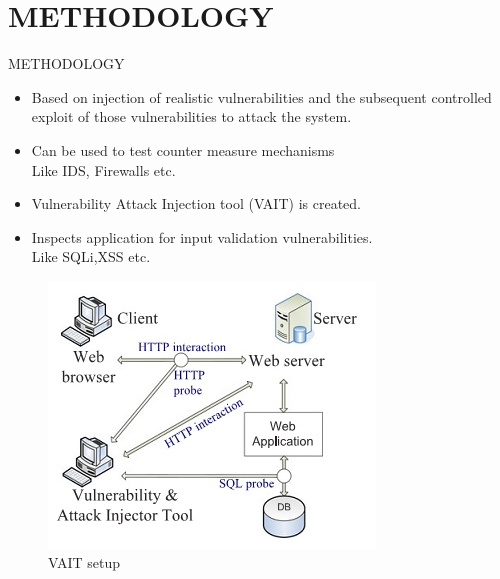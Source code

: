 \documentclass[xcolor=x11names,compress]{beamer}
\renewcommand{\(}{\begin{columns}}
\renewcommand{\)}{\end{columns}}
\newcommand{\<}[1]{\begin{column}{#1}}
\renewcommand{\>}{\end{column}}
\begin{document}
\section{\scshape METHODOLOGY}
\begin{frame}
\end{frame}
\begin{frame}{METHODOLOGY}
\begin{itemize}
	\item Based on injection of realistic vulnerabilities and the
	subsequent controlled exploit of those vulnerabilities to attack the system.
	\newline
	\item Can be  used to test counter measure mechanisms\\
	Like IDS, Firewalls etc.
	\newline
	\item Vulnerability Attack Injection tool (VAIT) is created.
	\newline
	\item Inspects application for input validation vulnerabilities.\\
	Like SQLi,XSS etc.
\end{itemize}
\end{frame}
\begin{frame}

\begin{figure}
\centering
\includegraphics[width=0.7\linewidth]{Main/Fig2}
\caption{VAIT setup}
\label{fig:Fig2}
\end{figure}

\end{frame}
\end{document}
